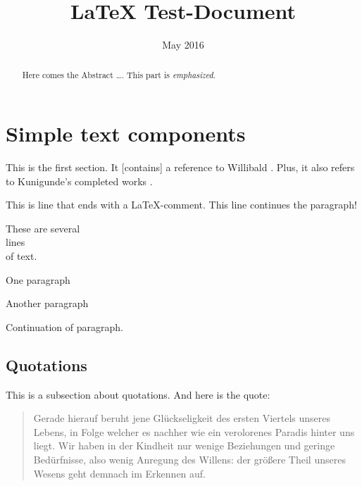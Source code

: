 \documentclass[12pt, english, a4paper]{article}
\begin{document}
\title{LaTeX Test-Document}

\date{May 2016}
 
\maketitle

\begin{abstract}
Here comes the Abstract \ldots. This part is {\em emphasized}.
\end{abstract}

\newpage

\tableofcontents

\section{Simple text components}

This is the first section. It [contains] a reference to
Willibald \citet[32]{Willibald2015}. Plus, it also refers to
Kunigunde's completed works \citep{Kunigunde2010}.

This is line that ends with a LaTeX-comment. %
This line continues the paragraph!

These are several \\
lines \\
of text.

One paragraph

Another paragraph


Continuation of paragraph.

\subsection{Quotations}

This is a subsection about quotations. And here is the quote:

\begin{quote}
    Gerade hierauf beruht jene Glückseligkeit des ersten Viertels unseres Lebens,
    in Folge welcher es nachher wie ein verolorenes Paradis hinter uns liegt.
    Wir haben in der Kindheit nur wenige Beziehungen und geringe Bedürfnisse, also wenig
    Anregung des Willens: der größere Theil unseres Wesens geht demnach im Erkennen auf.
    \cite[199]{Schopenhauer1851}
\end{quote}
\end{document}

